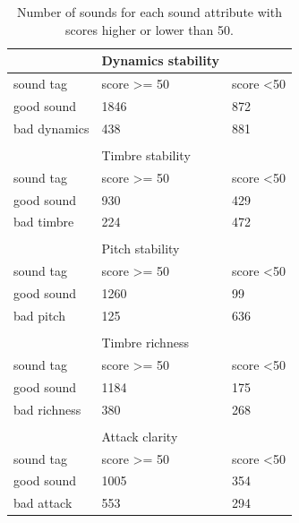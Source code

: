 \documentclass{article}
\begin{document}
\begin{table}[ht]
\centering
\begin{tabular}{lll}

             & Dynamics stability     &                    \\ \hline
sound tag    & score \textgreater= 50 & score \textless 50 \\ \hline
good sound   & 1846                   & 872                \\
bad dynamics & 438                    & 881                \\
             &                        &                    \\

             & Timbre stability       &                    \\ \hline
sound tag    & score \textgreater= 50 & score \textless 50 \\ \hline
good sound   & 930                    & 429                \\
bad timbre   & 224                    & 472                \\
             &                        &                    \\

             & Pitch stability        &                    \\ \hline
sound tag    & score \textgreater= 50 & score \textless 50 \\ \hline
good sound   & 1260                   & 99                 \\
bad pitch    & 125                    & 636                \\
			 &                        &                    \\

             & Timbre richness        &                    \\ \hline
sound tag    & score \textgreater= 50 & score \textless 50 \\ \hline
good sound   & 1184                   & 175                \\
bad richness & 380                    & 268                \\
             &                        &                    \\

             & Attack clarity         &                    \\ \hline
sound tag    & score \textgreater= 50 & score \textless 50 \\
good sound   & 1005                   & 354                \\
bad attack   & 553                    & 294                \\ \hline
\end{tabular}
\caption{Number of sounds for each sound attribute with scores higher or lower than 50.}
\label{results}
\end{table}
\end{document}
